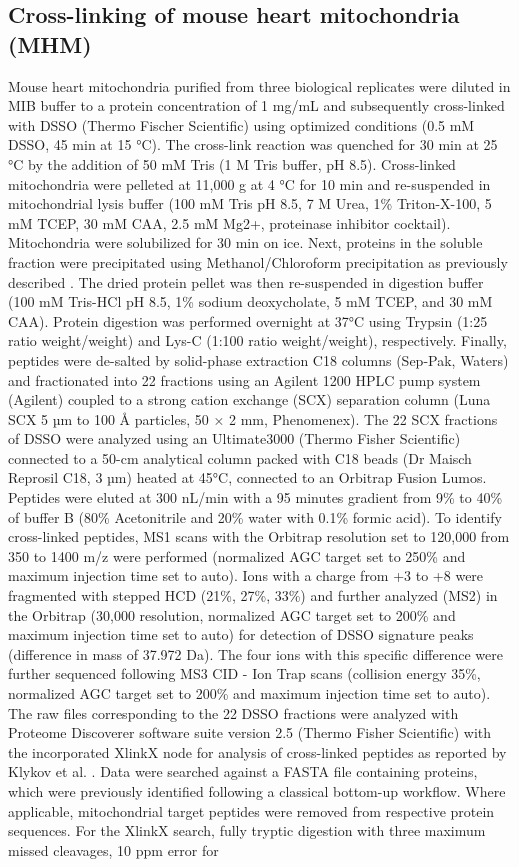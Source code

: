 \documentclass[times, twoside]{zHenriquesLab-StyleBioRxiv}
\begin{document}
\subsection*{Cross-linking of mouse heart mitochondria (MHM)}
Mouse heart mitochondria purified from three biological replicates were diluted in MIB buffer to a protein concentration of 1 mg/mL and subsequently cross-linked with DSSO (Thermo Fischer Scientific) using optimized conditions (0.5 mM DSSO, 45 min at 15 °C). The cross-link reaction was quenched for 30 min at 25 °C by the addition of 50 mM Tris (1 M Tris buffer, pH 8.5). Cross-linked mitochondria were pelleted at 11,000 g at 4 °C for 10 min and re-suspended in mitochondrial lysis buffer (100 mM Tris pH 8.5, 7 M Urea, 1\% Triton-X-100, 5 mM TCEP, 30 mM CAA, 2.5 mM Mg2+, proteinase inhibitor cocktail). Mitochondria were solubilized for 30 min on ice. Next, proteins in the soluble fraction were precipitated using Methanol/Chloroform precipitation as previously described \cite{Wessel_1984}. The dried protein pellet was then re-suspended in digestion buffer (100 mM Tris-HCl pH 8.5, 1\% sodium deoxycholate, 5 mM TCEP, and 30 mM CAA). Protein digestion was performed overnight at 37°C using Trypsin (1:25 ratio weight/weight) and Lys-C (1:100 ratio weight/weight), respectively. Finally, peptides were de-salted by solid-phase extraction C18 columns (Sep-Pak, Waters) and fractionated into 22 fractions using an Agilent 1200 HPLC pump system (Agilent) coupled to a strong cation exchange (SCX) separation column (Luna SCX 5 µm to 100 Å particles, 50 × 2 mm, Phenomenex). The 22 SCX fractions of DSSO were analyzed using an Ultimate3000 (Thermo Fisher Scientific) connected to a 50-cm analytical column packed with C18 beads (Dr Maisch Reprosil C18, 3 µm) heated at 45°C, connected to an Orbitrap Fusion Lumos. Peptides were eluted at 300 nL/min with a 95 minutes gradient from 9\% to 40\% of buffer B (80\% Acetonitrile and 20\% water with 0.1\% formic acid). To identify cross-linked peptides, MS1 scans with the Orbitrap resolution set to 120,000 from 350 to 1400 m/z were performed (normalized AGC target set to 250\% and maximum injection time set to auto). Ions with a charge from +3 to +8 were fragmented with stepped HCD (21\%, 27\%, 33\%) and further analyzed (MS2) in the Orbitrap (30,000 resolution, normalized AGC target set to 200\% and maximum injection time set to auto) for detection of DSSO signature peaks (difference in mass of 37.972 Da). The four ions with this specific difference were further sequenced following MS3 CID - Ion Trap scans (collision energy 35\%, normalized AGC target set to 200\% and maximum injection time set to auto). The raw files corresponding to the 22 DSSO fractions were analyzed with Proteome Discoverer software suite version 2.5 (Thermo Fisher Scientific) with the incorporated XlinkX node for analysis of cross-linked peptides as reported by Klykov et al. \cite{Klykov_2018}. Data were searched against a FASTA file containing proteins, which were previously identified following a classical bottom-up workflow. Where applicable, mitochondrial target peptides were removed from respective protein sequences. For the XlinkX search, fully tryptic digestion with three maximum missed cleavages, 10 ppm error for 
\end{document}
